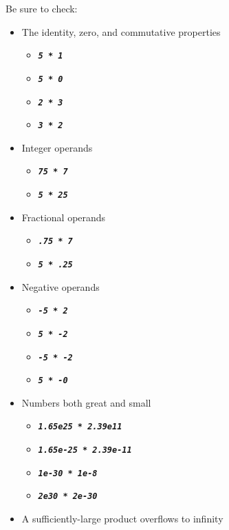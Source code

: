Be sure to check:
\begin{itemize}
    \item The identity, zero, and commutative properties
    \begin{itemize}
        \item[] \texttt{\textbf{\textit{5 * 1}}}
        \item[] \texttt{\textbf{\textit{5 * 0}}}
        \item[] \texttt{\textbf{\textit{2 * 3}}}
        \item[] \texttt{\textbf{\textit{3 * 2}}}
    \end{itemize}
    \item Integer operands
    \begin{itemize}
        \item[] \texttt{\textbf{\textit{75 * 7}}}
        \item[] \texttt{\textbf{\textit{5 * 25}}}
    \end{itemize}
    \item Fractional operands
    \begin{itemize}
        \item[] \texttt{\textbf{\textit{.75 * 7}}}
        \item[] \texttt{\textbf{\textit{5 * .25}}}
    \end{itemize}
    \item Negative operands
    \begin{itemize}
        \item[] \texttt{\textbf{\textit{-5 * 2}}}
        \item[] \texttt{\textbf{\textit{5 * -2}}}
        \item[] \texttt{\textbf{\textit{-5 * -2}}}
        \item[] \texttt{\textbf{\textit{5 * -0}}}
    \end{itemize}
    \item Numbers both great and small
    \begin{itemize}
        \item[] \texttt{\textbf{\textit{1.65e25 * 2.39e11}}}
        \item[] \texttt{\textbf{\textit{1.65e-25 * 2.39e-11}}}
        \item[] \texttt{\textbf{\textit{1e-30 * 1e-8}}}
        \item[] \texttt{\textbf{\textit{2e30 * 2e-30}}}
    \end{itemize}
    \item A sufficiently-large product overflows to infinity

\end{itemize}
